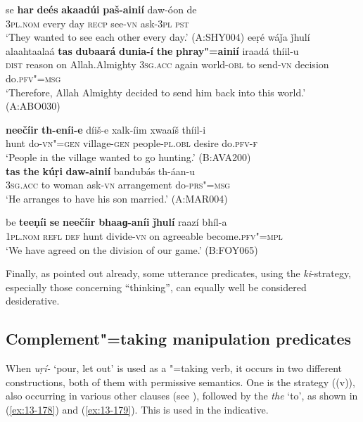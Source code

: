 \ea
\label{ex:13-173}
\gll se \textbf{har} \textbf{deés} \textbf{akaadúi} \textbf{paš-ainií} daw-óon de \\
\textsc{3pl.nom} every day \textsc{recp} see-\textsc{vn} ask-\textsc{3pl} \textsc{pst} \\
\glt `They wanted to see each other every day.' (A:SHY004)
\ex
\label{ex:13-174}
\gll eeṛé wáǰa ǰhulí alaahtaalaá \textbf{tas} \textbf{dubaará} \textbf{dunia-í} \textbf{the} \textbf{phray"=ainií} iraadá thíil-u\\
\textsc{dist} reason on Allah.Almighty \textsc{3sg.acc} again world-\textsc{obl}  to send-\textsc{vn} decision do.\textsc{pfv"=msg}\\
\glt `Therefore, Allah Almighty decided to send him back into this world.' (A:ABO030)

\ex
\label{ex:13-175}
\gll \textbf{neečíir} \textbf{th-eníi-e} díiš-e xalk-íim xwaaíš thíil-i \\
hunt do-\textsc{vn"=gen} village-\textsc{gen} people-\textsc{pl.obl} desire do.\textsc{pfv-f}\\
\glt `People in the village wanted to go hunting.' (B:AVA200)\\

\ex
\label{ex:13-176}
\gll \textbf{tas} \textbf{the} \textbf{kúṛi} \textbf{daw-ainií} bandubás th-áan-u \\
\textsc{3sg.acc} to woman ask-\textsc{vn}  arrangement do-\textsc{prs"=msg} \\
\glt `He arranges to have his son married.' (A:MAR004)

\ex
\label{ex:13-177}
\gll be \textbf{teeṇíi} \textbf{se} \textbf{neečíir} \textbf{bhaaɡ-aníi} \textbf{ǰhulí} raazí bhíl-a\\
\textsc{1pl.nom} \textsc{refl} \textsc{def} hunt divide-\textsc{vn} on agreeable become.\textsc{pfv"=mpl}\\
\glt `We have agreed on the division of our game.' (B:FOY065) 
\z

Finally, as pointed out already, some utterance predicates, using the \textit{ki}-strategy, especially those concerning ``thinking'', can equally well be considered desiderative.


\subsection{Complement"=taking manipulation predicates}
\label{subsec:13-5-3}

 When \textit{uṛí-} `pour, let out' is used as a "=taking verb, it occurs in two different constructions, both of them with permissive semantics. One is the  strategy ((v)), also occurring in various other  clauses (see ), followed by the  \textit{the} `to', as shown in (\ref{ex:13-178}) and (\ref{ex:13-179}). This is used in the indicative.

